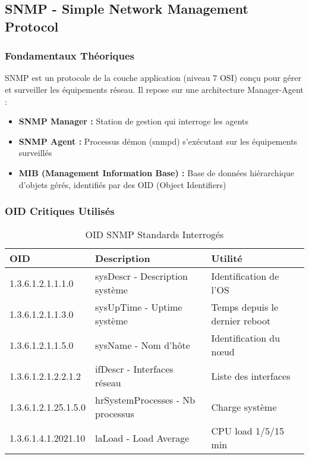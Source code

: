 \subsection{SNMP - Simple Network Management Protocol}

\subsubsection{Fondamentaux Théoriques}
SNMP est un protocole de la couche application (niveau 7 OSI) conçu pour gérer et surveiller les équipements réseau. Il repose sur une architecture Manager-Agent :

\begin{itemize}
    \item \textbf{SNMP Manager :} Station de gestion qui interroge les agents
    \item \textbf{SNMP Agent :} Processus démon (snmpd) s'exécutant sur les équipements surveillés
    \item \textbf{MIB (Management Information Base) :} Base de données hiérarchique d'objets gérés, identifiés par des OID (Object Identifiers)
\end{itemize}

\subsubsection{OID Critiques Utilisés}
\begin{table}[H]
\centering
\caption{OID SNMP Standards Interrogés}
\label{tab:snmp_oids}
\begin{tabular}{|l|p{6cm}|p{4cm}|}
\hline
\textbf{OID} & \textbf{Description} & \textbf{Utilité} \\
\hline
1.3.6.1.2.1.1.1.0 & sysDescr - Description système & Identification de l'OS \\
1.3.6.1.2.1.1.3.0 & sysUpTime - Uptime système & Temps depuis le dernier reboot \\
1.3.6.1.2.1.1.5.0 & sysName - Nom d'hôte & Identification du nœud \\
1.3.6.1.2.1.2.2.1.2 & ifDescr - Interfaces réseau & Liste des interfaces \\
1.3.6.1.2.1.25.1.5.0 & hrSystemProcesses - Nb processus & Charge système \\
1.3.6.1.4.1.2021.10 & laLoad - Load Average & CPU load 1/5/15 min \\
\hline
\end{tabular}
\end{table}

